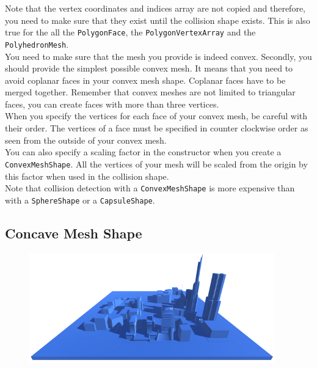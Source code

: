 \documentclass[a4paper,12pt]{article}
\begin{document}
    \vspace{0.6cm}

    Note that the vertex coordinates and indices array are not copied and therefore, you need to make sure that they exist until the collision shape exists. This is also true for
    the all the \texttt{PolygonFace}, the \texttt{PolygonVertexArray} and the \texttt{PolyhedronMesh}. \\

    You need to make sure that the mesh you provide is indeed convex. Secondly, you should provide the simplest possible convex mesh. It means that you need to avoid
    coplanar faces in your convex mesh shape. Coplanar faces have to be merged together. Remember that convex meshes are not limited to triangular faces, you can
    create faces with more than three vertices. \\

    When you specify the vertices for each face of your convex mesh, be careful with their order. The vertices of a face must be specified in counter clockwise order
    as seen from the outside of your convex mesh. \\

    You can also specify a scaling factor in the constructor when you create a \texttt{Convex\allowbreak MeshShape}. All the vertices of your mesh will be scaled from the origin by this factor
    when used in the collision shape. \\

    Note that collision detection with a \texttt{ConvexMeshShape} is more expensive than with a \texttt{SphereShape} or a \texttt{CapsuleShape}. \\

  \subsection{Concave Mesh Shape}

  \begin{figure}[h]
      \centering
      \includegraphics{concavemeshshape.png}
      \label{fig:concaveshape}
  \end{figure}
\end{document}
